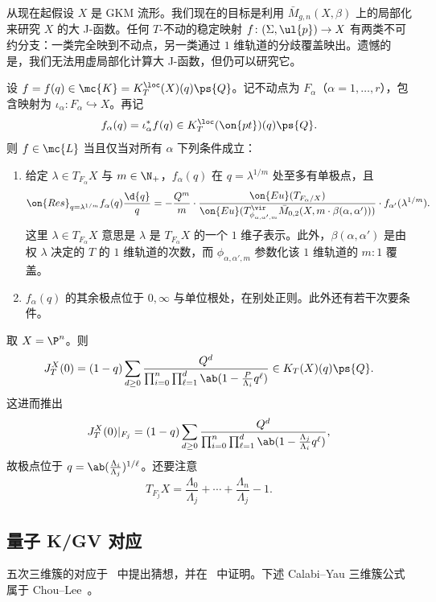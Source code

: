从现在起假设 \(X\) 是 GKM 流形。我们现在的目标是利用 \(\bar{M}_{g,n}(X, \beta)\) 上的局部化来研究 \(X\) 的大 J-函数。任何 \(T\)-不动的稳定映射 \(f \colon (\Sigma, \ul{p}) \to X\) 有两类不可约分支：一类完全映到不动点，另一类通过 \(1\) 维轨道的分歧覆盖映出。遗憾的是，我们无法用虚局部化计算大 J-函数，但仍可以研究它。

设 \(f = f(q) \in \mc{K} = K_T^{\loc}(X)(q)\ps{Q}\)。记不动点为 \(F_{\alpha}\)（\(\alpha = 1, \ldots, r\)），包含映射为 \(\iota_{\alpha} \colon F_{\alpha} \hookrightarrow X\)。再记
\[ f_{\alpha}(q) = \iota_{\alpha}^* f(q) \in K_T^{\loc}(\on{pt})(q)\ps{Q}. \]
则 \(f \in \mc{L}\) 当且仅当对所有 \(\alpha\) 下列条件成立：
\begin{enumerate}
    \item 给定 \(\lambda \in T_{F_{\alpha}} X\) 与 \(m \in \N_+\)，\(f_{\alpha}(q)\) 在 \(q = \lambda^{1/m}\) 处至多有单极点，且
        \[ \on{Res}_{q = \lambda^{1/m}} f_{\alpha}(q) \frac{\d{q}}{q} = -\frac{Q^m}{m} \cdot \frac{\on{Eu}(T_{F_{\alpha}/X})}{\on{Eu}(T^{\vir}_{\phi_{\alpha,\alpha',m}}\bar{M}_{0,2}(X, m \cdot \beta(\alpha, \alpha')))} \cdot f_{\alpha'}(\lambda^{1/m}). \]
        这里 \(\lambda \in T_{F_{\alpha}}X\) 意思是 \(\lambda\) 是 \(T_{F_{\alpha}} X\) 的一个 \(1\) 维子表示。此外，\(\beta(\alpha,\alpha')\) 是由权 \(\lambda\) 决定的 \(T\) 的 \(1\) 维轨道的次数，而 \(\phi_{\alpha, \alpha', m}\) 参数化该 \(1\) 维轨道的 \(m:1\) 覆盖。
    \item \(f_{\alpha}(q)\) 的其余极点位于 \(0, \infty\) 与单位根处，在别处正则。此外还有若干次要条件。
\end{enumerate}

\begin{exm}
    取 \(X = \P^n\)。则
    \[ J_T^X(0) = (1-q) \sum_{d \geq 0} \frac{Q^d}{\prod_{i=0}^n \prod_{\ell = 1}^d \ab(1 - \frac{P}{\Lambda_i} q^{\ell})} \in K_T(X)(q) \ps{Q}. \]
    这进而推出
    \[ J_T^X(0) |_{F_j} = (1-q) \sum_{d \geq 0} \frac{Q^d}{\prod_{i=0}^n \prod_{\ell = 1}^d \ab(1 - \frac{\Lambda_j}{\Lambda_i}q^{\ell})}, \]
    故极点位于 \(q = \ab(\frac{\Lambda_i}{\Lambda_j})^{1/\ell}\)。还要注意
    \[ T_{F_j} X = \frac{\Lambda_0}{\Lambda_j} + \cdots + \frac{\Lambda_n}{\Lambda_j} - 1. \]
\end{exm}

\subsection{量子 K/GV 对应}%
\label{sub:Quantum K/GV correspondence}

五次三维簇的对应于~\cite{GaroufalidisScheidegger2022} 中提出猜想，并在~\cite{ChouLeeQuintic} 中证明。下述 Calabi--Yau 三维簇公式属于 Chou--Lee~\cite{ChouLee2025}。

